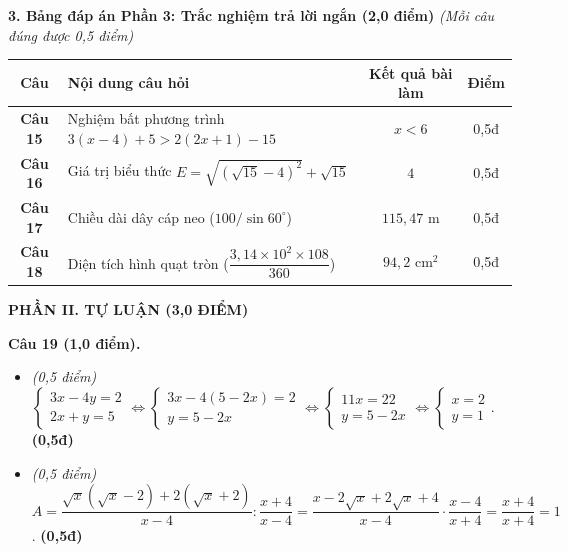 \documentclass[11pt,a4paper]{article}
\begin{document}
\vspace{2mm}
\noindent
\textbf{3. Bảng đáp án Phần 3: Trắc nghiệm trả lời ngắn (2,0 điểm)} \textit{(Mỗi câu đúng được 0,5 điểm)}
\begin{center}
\begin{tabular}{|c|l|c|c|}
\hline
\textbf{Câu} & \textbf{Nội dung câu hỏi} & \textbf{Kết quả bài làm} & \textbf{Điểm} \\
\hline
\textbf{Câu 15} & Nghiệm bất phương trình $3(x - 4) + 5 > 2(2x + 1) - 15$ & \textbf{$x < 6$} & 0,5đ \\
\hline
\textbf{Câu 16} & Giá trị biểu thức $E = \sqrt{(\sqrt{15}-4)^2} + \sqrt{15}$ & \textbf{$4$} & 0,5đ \\
\hline
\textbf{Câu 17} & Chiều dài dây cáp neo ($100 / \sin 60^\circ$) & \textbf{$115{,}47\text{ m}$} & 0,5đ \\
\hline
\textbf{Câu 18} & Diện tích hình quạt tròn ($\dfrac{3{,}14 \times 10^2 \times 108}{360}$) & \textbf{$94{,}2\text{ cm}^2$} & 0,5đ \\
\hline
\end{tabular}
\end{center}

\vspace{3mm}
\noindent
\textbf{\large PHẦN II. TỰ LUẬN (3,0 ĐIỂM)}

\vspace{2mm}
\textbf{Câu 19 (1,0 điểm).}
\begin{itemize}
  \item[a)] \textit{(0,5 điểm)} $\begin{cases} 3x - 4y = 2 \\ 2x + y = 5 \end{cases} \Leftrightarrow \begin{cases} 3x - 4(5 - 2x) = 2 \\ y = 5 - 2x \end{cases} \Leftrightarrow \begin{cases} 11x = 22 \\ y = 5 - 2x \end{cases} \Leftrightarrow \begin{cases} x = 2 \\ y = 1 \end{cases}$. \hfill \textbf{(0,5đ)}
  \item[b)] \textit{(0,5 điểm)} $A = \dfrac{\sqrt{x}(\sqrt{x}-2) + 2(\sqrt{x}+2)}{x - 4} : \dfrac{x+4}{x-4} = \dfrac{x - 2\sqrt{x} + 2\sqrt{x} + 4}{x - 4} \cdot \dfrac{x - 4}{x + 4} = \dfrac{x + 4}{x + 4} = 1$. \hfill \textbf{(0,5đ)}
\end{itemize}
\end{document}
